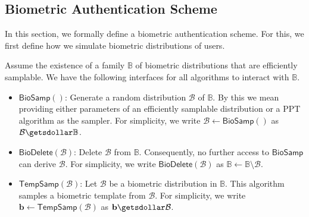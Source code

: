 



\subsection{Biometric Authentication Scheme}

In this section, we formally define a biometric authentication scheme. For this, we first define how we simulate biometric distributions of users.

Assume the existence of a family $\mathbb{B}$ of biometric distributions that are efficiently samplable. We have the following interfaces for all algorithms to interact with $\mathbb{B}$.

\begin{itemize}

	\item $\mathsf{BioSamp}()$: Generate a random distribution $\mathcal{B}$ of $\mathbb{B}$. By this we mean providing either parameters of an efficiently samplable distribution or a PPT algorithm as the sampler. For simplicity, we write $\mathcal{B} \gets \mathsf{BioSamp}()$ as $\mathcal{B} \getsdollar \mathbb{B}$.
	
	\item $\mathsf{BioDelete}(\mathcal{B})$: Delete $\mathcal{B}$ from $\mathbb{B}$. Consequently, no further access to $\mathsf{BioSamp}$ can derive $\mathcal{B}$. For simplicity, we write $\mathsf{BioDelete}(\mathcal{B})$ as $\mathbb{B} \gets \mathbb{B} \setminus \mathcal{B}$.

	\item $\mathsf{TempSamp}(\mathcal{B})$: Let $\mathcal{B}$ be a biometric distribution in $\mathbb{B}$. This algorithm samples a biometric template from $\mathcal{B}$. For simplicity, we write $\mathbf{b} \gets \mathsf{TempSamp}(\mathcal{B})$ as $\mathbf{b} \getsdollar \mathcal{B}$.

\end{itemize}

